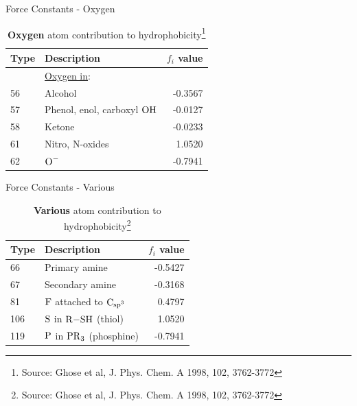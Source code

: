 \documentclass{beamer}
\begin{document}
\begin{frame}{Force Constants - Oxygen}
    \centering
        \begin{table}[H]
            \caption{\textbf{Oxygen} atom contribution to hydrophobicity\footnote{Source: Ghose et al, J. Phys. Chem. A 1998, 102, 3762-3772}}
            \begin{tabular}{l l r}
                Type & Description & $f_i$ value \\
                \hline
                    & \underline{Oxygen in}:           &         \\
                56  & Alcohol                          & -0.3567 \\
                57  & Phenol, enol, carboxyl $\ce{OH}$ & -0.0127 \\
                58  & Ketone                           & -0.0233 \\
                61  & Nitro, N-oxides                  &  1.0520 \\
                62  & $\ce{O-}$                        & -0.7941 \\
                \hline
            \end{tabular}
        \end{table}
\end{frame}
\begin{frame}{Force Constants - Various}
    \centering
        \begin{table}[H]
            \caption{\textbf{Various} atom contribution to hydrophobicity\footnote{Source: Ghose et al, J. Phys. Chem. A 1998, 102, 3762-3772}}
            \begin{tabular}{l l r}
                Type & Description & $f_i$ value \\
                \hline
                66   & Primary amine                          & -0.5427 \\
                67   & Secondary amine                        & -0.3168 \\
                81   & $\ce{F}$ attached to $\ce{C_{sp^{3}}}$ &  0.4797 \\
                106  & $\ce{S}$ in $\ce{R-SH}$   (thiol)      &  1.0520 \\
                119  & $\ce{P}$ in $\ce{PR_{3}}$ (phosphine)  & -0.7941 \\
                \hline
            \end{tabular}
        \end{table}
\end{frame}
\end{document}
